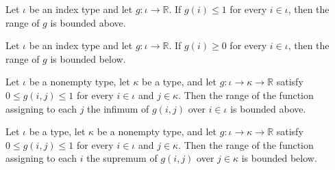 \begin{lemma}
\label{OnlineLearning.bddAbove_of_le_one}
\leanok
{}
Let $\iota$ be an index type and let $g:\iota\to\mathbb{R}$. If $g(i)\le 1$ for every
$i\in\iota$, then the range of $g$ is bounded above.
\end{lemma}

\begin{lemma}
\label{OnlineLearning.bddBelow_of_nonneg}
\leanok
{}
Let $\iota$ be an index type and let $g:\iota\to\mathbb{R}$. If $g(i)\ge 0$ for every
$i\in\iota$, then the range of $g$ is bounded below.
\end{lemma}

\begin{lemma}
\label{OnlineLearning.bddAbove_range_iInf_of_unitInterval}
\leanok
{}
Let $\iota$ be a nonempty type, let $\kappa$ be a type, and let
$g:\iota\to\kappa\to\mathbb{R}$ satisfy $0\le g(i,j)\le 1$ for every $i\in\iota$ and
$j\in\kappa$. Then the range of the function assigning to each $j$ the infimum of
$g(i,j)$ over $i\in\iota$ is bounded above.
\end{lemma}

\begin{lemma}
\label{OnlineLearning.bddBelow_range_iSup_of_unitInterval}
\leanok
{}
Let $\iota$ be a type, let $\kappa$ be a nonempty type, and let
$g:\iota\to\kappa\to\mathbb{R}$ satisfy $0\le g(i,j)\le 1$ for every $i\in\iota$ and
$j\in\kappa$. Then the range of the function assigning to each $i$ the supremum of
$g(i,j)$ over $j\in\kappa$ is bounded below.
\end{lemma}

